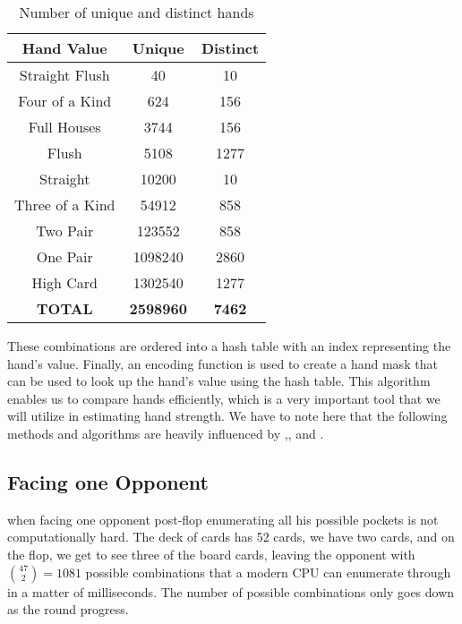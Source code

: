 \begin{table}[h]
    \centering
    \begin{tabular}{|c|c|c|}
        \hline
        \textbf{Hand Value}      & \textbf{Unique}  & \textbf{Distinct} \\\hline
        Straight Flush  & 40      & 10       \\\hline
        Four of a Kind  & 624     & 156      \\\hline
        Full Houses     & 3744    & 156      \\\hline
        Flush           & 5108    & 1277     \\\hline
        Straight        & 10200   & 10       \\\hline
        Three of a Kind & 54912   & 858      \\\hline
        Two Pair        & 123552  & 858      \\\hline
        One Pair        & 1098240 & 2860     \\\hline
        High Card       & 1302540 & 1277     \\\hline
        \textbf{TOTAL}           & \textbf{2598960} & \textbf{7462}     \\\hline
    \end{tabular}
    \caption{Number of unique and distinct hands}
    \label{tab:unique}
\end{table}

These combinations are ordered into a hash table with an index representing the hand's value. Finally, an encoding function is used to create a hand mask that can be used to look up the hand's value using the hash table. This algorithm enables us to compare hands efficiently, which is a very important tool that we will utilize in estimating hand strength. We have to note here that the following methods and algorithms are heavily influenced by \cite{billings_challenge_2002},\cite{papp_dealing_1998}, and \cite{davidson_improved_2000}.


\subsection{Facing one Opponent}
when facing one opponent post-flop enumerating all his possible pockets is not computationally hard. The deck of cards has 52 cards, we have two cards, and on the flop, we get to see three of the board cards, leaving the opponent with ${47 \choose 2} = 1081$ possible combinations that a modern  CPU can enumerate through in a matter of milliseconds. The number of possible combinations only goes down as the round progress.

